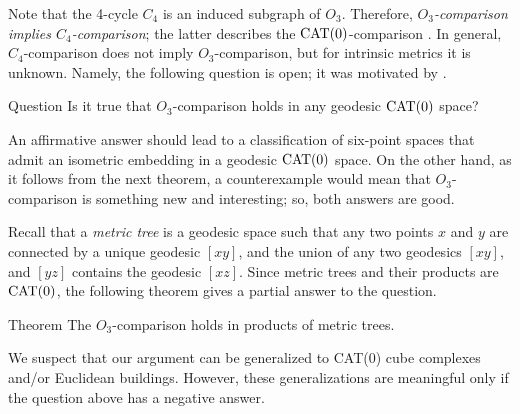\documentclass{article}
\begin{document}
Note that the 4-cycle $C_4$ is an induced subgraph of $O_3$.
Therefore, \textit{$O_3$-comparison implies $C_4$-comparison};
the latter describes the $\mathrm{CAT}(0)$-comparison \cite{alexander-kapovitch-petrunin2022}.
In general, $C_4$-comparison does not imply $O_3$-comparison,
but for intrinsic metrics it is unknown.
Namely, the following question is open; it was motivated by \cite[1.19$_+(e)$]{gromov2007}.

\begin{thm}{Question}
Is it true that $O_3$-comparison holds in any geodesic $\mathrm{CAT}(0)$ space?
\end{thm}

An affirmative answer should lead to a classification of six-point spaces that admit an isometric embedding in a geodesic $\mathrm{CAT}(0)$ space.
On the other hand, as it follows from the next theorem,
a counterexample would mean that $O_3$-comparison is something new and interesting;
so, both answers are good.

Recall that a \emph{metric tree} is a geodesic space such that any two points $x$ and $y$ are connected by a unique geodesic $[xy]$,
and the union of any two geodesics $[xy]$, and $[yz]$ contains the geodesic $[xz]$.
Since metric trees and their products are $\mathrm{CAT}(0)$, the following theorem gives a partial answer to the question.

\begin{thm}{Theorem}
The $O_3$-comparison holds in products of metric trees.
\end{thm}

We suspect that our argument can be generalized to CAT(0) cube complexes and/or Euclidean buildings.
However, these generalizations are meaningful only if the question above has a negative answer.
\end{document}
